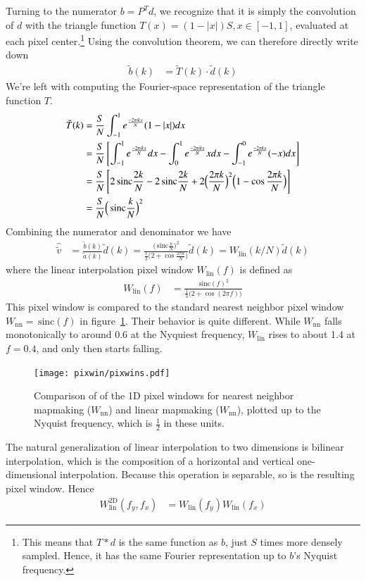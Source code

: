 \documentclass{aa}
\newcommand\sinc{\,\text{sinc}}
\begin{document}
Turning to the numerator $b = P^Td$, we recognize that it is simply the convolution of $d$ with
the triangle function $T(x) = (1-|x|)S, x\in [-1,1]$, evaluated at each pixel center.\footnote{
This means that $T*d$ is the same function as $b$, just $S$ times more densely sampled. Hence,
it has the same Fourier representation up to $b$'s Nyquist frequency.}
Using the convolution theorem, we can therefore directly write down
\begin{align}
	\tilde b(k) &= \tilde T(k) \cdot \tilde d(k)
\end{align}
We're left with computing the Fourier-space representation of the triangle function $T$.
\begin{align}
	\tilde T(k) &= \frac{S}{N} \int_{-1}^1 e^\frac{-2\pi i k x}{N} (1 - |x|) dx \notag \\
	&= \frac{S}{N}\left[\int_{-1}^1 e^\frac{-2\pi i k x}{N} dx - \int_0^1 e^\frac{-2\pi i k x}{N} x dx - \int_{-1}^0 e^\frac{-2\pi k x}{N} (-x) dx\right] \notag \\
	&= \frac{S}{N}\left[ 2 \sinc\frac{2k}{N} -  2\sinc\frac{2k}{N} + 2\Big(\frac{2\pi k}{N}\Big)^2 \Big(1-\cos\frac{2\pi k}{N}\Big)\right] \notag \\
	&= \frac{S}{N}\Big(\sinc\frac{k}{N}\Big)^2
\end{align}
Combining the numerator and denominator we have
\begin{align}
	\hat {\tilde v} &= \frac{\tilde b(k)}{\tilde a(k)} \tilde d(k) = \frac{\big(\sinc\frac{k}{N}\big)^2}{\frac{1}{3}\big(2+\cos\frac{2\pi k}{N}\big)} \tilde d(k) = W_\text{lin}(k/N) \tilde d(k)
\end{align}
where the linear interpolation pixel window $W_\text{lin}(f)$ is defined as
\begin{align}
	W_\text{lin}(f) &= \frac{\sinc(f)^2}{\frac{1}{3}\big(2+\cos(2\pi f)\big)}
\end{align}
This pixel window is compared to the standard nearest neighbor pixel window $W_\text{nn} = \sinc(f)$
in figure~\ref{fig:pixwins}. Their behavior is quite different. While $W_\text{nn}$ falls monotonically
to around 0.6 at the Nyquiest frequency, $W_\text{lin}$ rises to about 1.4 at $f = 0.4$, and only then
starts falling.
\begin{figure}[ht]
	\centering
	\texttt{[image: pixwin/pixwins.pdf]}
	\caption{Comparison of of the 1D pixel windows for nearest neighbor mapmaking ($W_\text{nn}$)
	and linear mapmaking ($W_\text{nn}$), plotted up to the Nyquist frequency, which is $\frac12$ in
	these units.}
	\label{fig:pixwins}
\end{figure}

The natural generalization of linear interpolation to two dimensions is bilinear interpolation,
which is the composition of a horizontal and vertical one-dimensional interpolation. Because this
operation is separable, so is the resulting pixel window. Hence
\begin{align}
	W_\text{lin}^\text{2D}(f_y,f_x) &= W_\text{lin}(f_y) W_\text{lin}(f_x)
\end{align}
\end{document}
